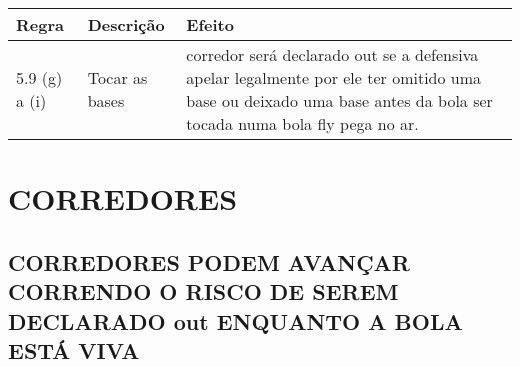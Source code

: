 {\footnotesize\begin{tabular}{p{15mm}p{60mm}p{90mm}}
		Regra& Descrição & Efeito\\\hline
		5.9 (g) a (i) & Tocar as bases
		&
		corredor será declarado \gls{out} se a defensiva apelar legalmente por ele ter omitido uma base ou deixado uma base antes da bola ser tocada numa bola \gls{fly} pega no ar.
\end{tabular}}

\section{CORREDORES}

\subsection{CORREDORES PODEM AVANÇAR CORRENDO O RISCO DE SEREM DECLARADO \gls{out} ENQUANTO A BOLA ESTÁ VIVA}
